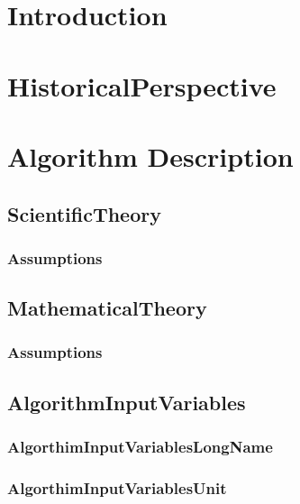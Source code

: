 \documentclass[12pt]{article}
\begin{document}
\maketitle

\tableofcontents

\section{Introduction}
\Introduction

\section{HistoricalPerspective}
\HistoricalPerspective

\section{Algorithm Description}
\AlgDesc

\subsection{ScientificTheory}
\ScientificTheory

\subsubsection{Assumptions}
\ScientificTheoryAssumptions

\subsection{MathematicalTheory}
\MathematicalTheory

\subsubsection{Assumptions}
\MathematicalTheoryAssumptions

\subsection{AlgorithmInputVariables}
\AlgorithmInputVariables

\subsubsection{AlgorthimInputVariablesLongName}
\AlgorthimInputVariablesLongName

\subsubsection{AlgorthimInputVariablesUnit}
\AlgorthimInputVariablesUnit
\end{document}
